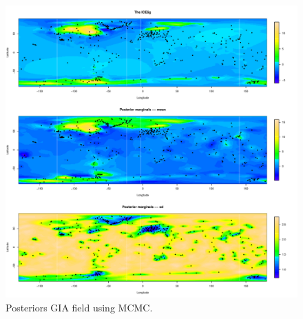 \documentclass[a4paper,12pt]{article}
\begin{document}
 \begin{figure}[htbp]
 \begin{center}
 \includegraphics[scale=0.55]{fig/1bslice1_1000_GIAfield1.pdf}
 \end{center}
 \caption[Posterior field]{Posteriors GIA field using MCMC.}
 \label{fig:5}
 \end{figure}
 
 
 


%
\end{document}
